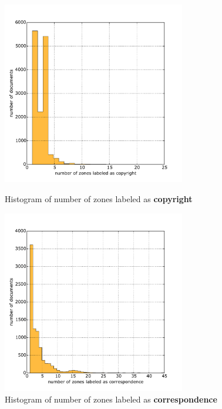 \begin{figure}
\centering
\begin{minipage}[t!]{0.48\linewidth}
  \includegraphics[width=8cm]{plots/copyright_histogram}
  \caption{Histogram of number of zones labeled as \textbf{copyright}}
  \label{fig:_histogram}
\end{minipage}
\quad
\begin{minipage}[t!]{0.48\linewidth}
  \includegraphics[width=8cm]{plots/correspondence_histogram}
  \caption{Histogram of number of zones labeled as \textbf{correspondence}}
  \label{fig:correspondence_histogram}
\end{minipage}
\end{figure}

